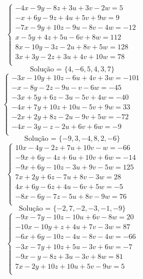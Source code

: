 \documentclass[12pt,oneside,a4paper]{article}
\begin{document}
\vspace{\baselineskip}
\begin{equation*}
\begin{cases}
-4x-9y-8z+3u+3v-2w=5 \\
-x+6y-9z+4u+5v+9w=9 \\
-7x-9y+10z-9u-8v-4w=-12 \\
x-5y+4z+5u-6v+8w=112 \\
8x-10y-3z-2u+8v+5w=128 \\
3x+3y-2z+3u+4v+10w=78 \\
\end{cases}
\end{equation*}
\begin{equation*}
\text{Solução = }\{4,-6,5,4,3,7\}
\end{equation*}
\vspace{\baselineskip}
\begin{equation*}
\begin{cases}
-3x-10y+10z-6u+4v+3w=-101 \\
-x-8y-2z-9u-v-6w=-45 \\
-3x+5y+6z-3u-5v+4w=-40 \\
-4x+7y+10z+10u-5v+9w=33 \\
-2x+2y+8z-2u-9v+5w=-72 \\
-4x-3y-z-2u+6v+6w=-9 \\
\end{cases}
\end{equation*}
\begin{equation*}
\text{Solução = }\{-9,3,-4,8,2,-6\}
\end{equation*}
\vspace{\baselineskip}
\begin{equation*}
\begin{cases}
10x-4y-2z+7u+10v-w=-66 \\
-9x+6y-4z+6u+10v+6w=-14 \\
-9x+6y-10z-3u+9v-5w=125 \\
7x+2y+6z-7u+8v-3w=28 \\
4x+6y-6z+4u-6v+5w=-5 \\
-8x-6y-7z-5u+8v-9w=76 \\
\end{cases}
\end{equation*}
\begin{equation*}
\text{Solução = }\{-2,7,-2,-3,-1,-9\}
\end{equation*}
\vspace{\baselineskip}
\begin{equation*}
\begin{cases}
-9x-7y-10z-10u+6v-8w=20 \\
-10x-10y+z+4u+7v-3w=87 \\
-6x+6y-10z-4u-8v-4w=-66 \\
-3x-7y+10z+5u-3v+6w=-7 \\
-9x-y-8z+3u-3v+8w=81 \\
7x-2y+10z+10u+5v-9w=5 \\
\end{cases}
\end{equation*}
\end{document}
